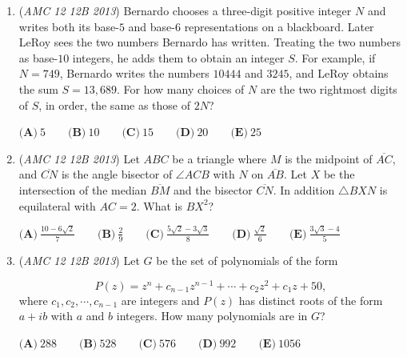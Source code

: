 \begin{enumerate}
 \[8(\log_n x)(\log_m x)-7\log_n x-6 \log_m x-2013 = 0\]
is the smallest possible integer. What is $m+n$?


 $\textbf{(A)}\ 12\qquad\textbf{(B)}\ 20\qquad\textbf{(C)}\ 24\qquad\textbf{(D)}\ 48\qquad\textbf{(E)}\ 272$


	\item (\textit{AMC 12 12B 2013}) Bernardo chooses a three-digit positive integer $N$ and writes both its base-$5$ and base-$6$ representations on a blackboard. Later LeRoy sees the two numbers Bernardo has written. Treating the two numbers as base-$10$ integers, he adds them to obtain an integer $S$. For example, if $N=749$, Bernardo writes the numbers $10444$ and $3245$, and LeRoy obtains the sum $S=13,689$. For how many choices of $N$ are the two rightmost digits of $S$, in order, the same as those of $2N$?


 $\textbf{(A)}\ 5\qquad\textbf{(B)}\ 10\qquad\textbf{(C)}\ 15\qquad\textbf{(D)}\ 20\qquad\textbf{(E)}\ 25$


	\item (\textit{AMC 12 12B 2013}) Let $ABC$ be a triangle where $M$ is the midpoint of $\overline{AC}$, and $\overline{CN}$ is the angle bisector of $\angle{ACB}$ with $N$ on $\overline{AB}$. Let $X$ be the intersection of the median $\overline{BM}$ and the bisector $\overline{CN}$. In addition $\triangle BXN$ is equilateral with $AC=2$. What is $BX^2$?


 $\textbf{(A)}\  \frac{10-6\sqrt{2}}{7} \qquad \textbf{(B)}\ \frac{2}{9} \qquad \textbf{(C)}\ \frac{5\sqrt{2}-3\sqrt{3}}{8} \qquad \textbf{(D)}\ \frac{\sqrt{2}}{6} \qquad \textbf{(E)}\ \frac{3\sqrt{3}-4}{5}$


	\item (\textit{AMC 12 12B 2013}) Let $G$ be the set of polynomials of the form

 \[P(z)=z^n+c_{n-1}z^{n-1}+\cdots+c_2z^2+c_1z+50,\]
where $c_1,c_2,\cdots, c_{n-1}$ are integers and $P(z)$ has distinct roots of the form $a+ib$ with $a$ and $b$ integers. How many polynomials are in $G$?


 $\textbf{(A)}\ 288\qquad\textbf{(B)}\ 528\qquad\textbf{(C)}\ 576\qquad\textbf{(D)}\ 992\qquad\textbf{(E)}\ 1056$


\end{enumerate}